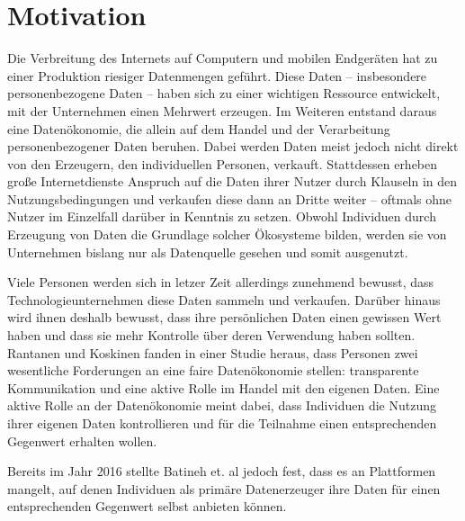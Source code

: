 \section{Motivation}\label{Motivation}
Die Verbreitung des Internets auf Computern und mobilen Endgeräten hat zu einer Produktion riesiger Datenmengen geführt. Diese Daten -- insbesondere personenbezogene Daten -- haben sich zu einer wichtigen Ressource entwickelt, mit der Unternehmen einen Mehrwert erzeugen. Im Weiteren entstand daraus eine Datenökonomie, die allein auf dem Handel und der Verarbeitung personenbezogener Daten beruhen. \cite{humanDemand_2020} Dabei werden Daten meist jedoch nicht direkt von den Erzeugern, den individuellen Personen, verkauft. Stattdessen erheben große Internetdienste Anspruch auf die Daten ihrer Nutzer durch Klauseln in den Nutzungsbedingungen und verkaufen diese dann an Dritte weiter -- oftmals ohne Nutzer im Einzelfall darüber in Kenntnis zu setzen. Obwohl Individuen durch Erzeugung von Daten die Grundlage solcher Ökosysteme bilden, werden sie von Unternehmen bislang nur als Datenquelle gesehen und somit ausgenutzt. \cite{monetizingData_2016} \newline

\noindent Viele Personen werden sich in letzer Zeit allerdings zunehmend bewusst, dass Technologieunternehmen diese Daten sammeln und verkaufen. Darüber hinaus wird ihnen deshalb bewusst, dass ihre persönlichen Daten einen gewissen Wert haben und dass sie mehr Kontrolle über deren Verwendung haben sollten. Rantanen und Koskinen fanden in einer Studie heraus, dass Personen zwei wesentliche Forderungen an eine faire Datenökonomie stellen: transparente Kommunikation und eine aktive Rolle im Handel mit den eigenen Daten. Eine aktive Rolle an der Datenökonomie meint dabei, dass Individuen die Nutzung ihrer eigenen Daten kontrollieren und für die Teilnahme einen entsprechenden Gegenwert erhalten wollen. \cite{humanDemand_2020} \newline

\noindent Bereits im Jahr 2016 stellte Batineh et. al jedoch fest, dass es an Plattformen mangelt, auf denen Individuen als primäre Datenerzeuger ihre Daten für einen entsprechenden Gegenwert selbst anbieten können. \cite{monetizingData_2016}